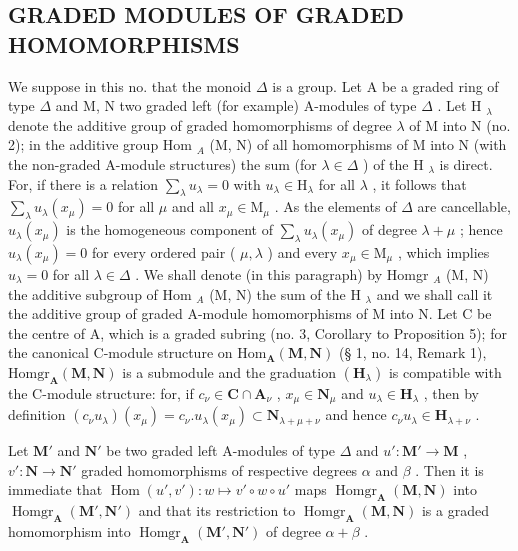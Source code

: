 \subsection{GRADED MODULES OF GRADED HOMOMORPHISMS}

We suppose in this no. that the monoid \(\Delta\) is a group. Let A be a graded ring of type \(\Delta\) and M, N two graded left (for example) A-modules of type \(\Delta\) . Let H \(_{\lambda}\) denote the additive group of graded homomorphisms of degree \(\lambda\) of M into N (no. 2); in the additive group Hom \(_{A}\) (M, N) of all homomorphisms of M into N (with the non-graded A-module structures) the sum (for \(\lambda \in \Delta\) ) of the H \(_{\lambda}\) is direct. For, if there is a relation \(\sum_{\lambda} u_{\lambda} = 0\) with \(u_{\lambda} \in \mathrm{H}_{\lambda}\) for all \(\lambda\) , it follows that \(\sum_{\lambda} u_{\lambda}(x_{\mu}) = 0\) for all \(\mu\) and all \(x_{\mu} \in \mathrm{M}_{\mu}\) . As the elements of \(\Delta\) are cancellable, \(u_{\lambda}(x_{\mu})\) is the homogeneous component of \(\sum_{\lambda} u_{\lambda}(x_{\mu})\) of degree \(\lambda + \mu\) ; hence \(u_{\lambda}(x_{\mu}) = 0\) for every ordered pair ( \(\mu, \lambda\) ) and every \(x_{\mu} \in \mathrm{M}_{\mu}\) , which implies \(u_{\lambda} = 0\) for all \(\lambda \in \Delta\) . We shall denote (in this paragraph) by Homgr \(_{A}\) (M, N) the additive subgroup of Hom \(_{A}\) (M, N) the sum of the H \(_{\lambda}\) and we shall call it the additive group of graded A-module homomorphisms of M into N. Let C be the centre of A, which is a graded subring (no. 3, Corollary to Proposition 5); for the canonical C-module structure on \(\mathrm{Hom}_{\mathbf{A}}(\mathbf{M},\mathbf{N})\) (§ 1, no. 14, Remark 1), \(\mathrm{Homgr}_{\mathbf{A}}(\mathbf{M},\mathbf{N})\) is a submodule and the graduation \((\mathbf{H}_{\lambda})\) is compatible with the C-module structure: for, if \(c_{\nu}\in \mathbf{C}\cap \mathbf{A}_{\nu}\) , \(x_{\mu}\in \mathbf{N}_{\mu}\) and \(u_{\lambda}\in \mathbf{H}_{\lambda}\) , then by definition \((c_{\nu}u_{\lambda})(x_{\mu}) = c_{\nu}.u_{\lambda}(x_{\mu})\subset \mathbf{N}_{\lambda +\mu +\nu}\) and hence \(c_{\nu}u_{\lambda}\in \mathbf{H}_{\lambda +\nu}\) .

Let \(\mathbf{M}'\) and \(\mathbf{N}'\) be two graded left A-modules of type \(\Delta\) and \(u':\mathbf{M}'\to\mathbf{M}\) , \(v':\mathbf{N}\to\mathbf{N}'\) graded homomorphisms of respective degrees \(\alpha\) and \(\beta\) . Then it is immediate that \(\operatorname{Hom}(u',v')\colon w\mapsto v'\circ w\circ u'\) maps \(\operatorname{Homgr}_{\mathbf{A}}(\mathbf{M},\mathbf{N})\) into \(\operatorname{Homgr}_{\mathbf{A}}(\mathbf{M}',\mathbf{N}')\) and that its restriction to \(\operatorname{Homgr}_{\mathbf{A}}(\mathbf{M},\mathbf{N})\) is a graded homomorphism into \(\operatorname{Homgr}_{\mathbf{A}}(\mathbf{M}',\mathbf{N}')\) of degree \(\alpha+\beta\) .

